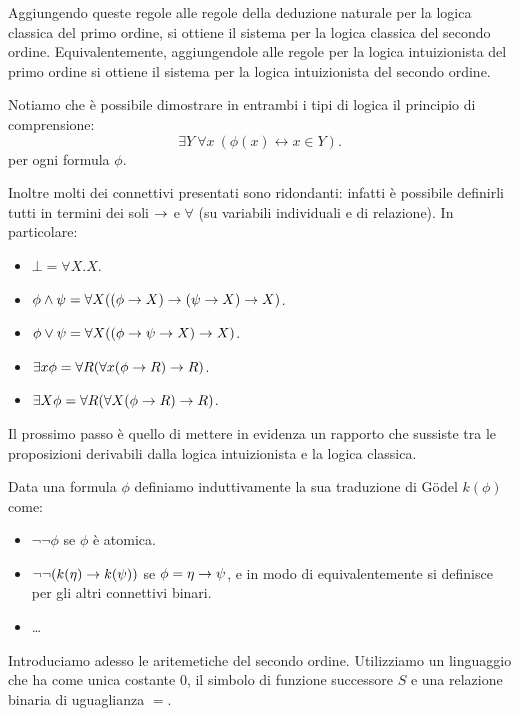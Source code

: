 \documentclass[]{marticle}
\begin{document}
Aggiungendo queste regole alle regole della deduzione naturale per la logica
classica del primo ordine, si ottiene il sistema per la logica classica del
secondo ordine. Equivalentemente, aggiungendole alle regole per la logica
intuizionista del primo ordine si ottiene il sistema per la logica intuizionista
del secondo ordine.

Notiamo che \`e possibile dimostrare in entrambi i tipi di logica il principio
di comprensione:
\[
    \exists Y\ \forall x\ (\phi(x) \leftrightarrow x\in Y).
\]
per ogni formula $\phi$.

Inoltre molti dei connettivi presentati sono ridondanti: infatti \`e possibile
definirli tutti in termini dei soli $\rightarrow$ e $\forall$ (su variabili individuali
e di relazione). In particolare: 
\begin{itemize}
    \item $\bot = \forall X.X$.
    \item $\phi \land \psi = \forall X ((\phi\rightarrow X)\rightarrow (\psi\rightarrow X) \rightarrow X)$.
    \item $\phi \lor \psi = \forall X ((\phi\rightarrow\psi\rightarrow X) \rightarrow X)$.
    \item $\exists x \phi = \forall R (\forall x(\phi\rightarrow R)\rightarrow R)$.
    \item $\exists X \phi = \forall R (\forall X(\phi\rightarrow R)\rightarrow R)$.
\end{itemize}

Il prossimo passo \`e quello di mettere in evidenza un rapporto che sussiste tra
le proposizioni derivabili dalla logica intuizionista e la logica classica.
\begin{block}[Definizione]
    Data una formula $\phi$ definiamo induttivamente la sua traduzione di
    G\"odel $k(\phi)$ come:
    \begin{itemize}
        \item $\lnot\lnot \phi$ se $\phi$ \`e atomica.
        \item $\lnot\lnot(k(\eta)\rightarrow k(\psi))$ se $\phi=\eta\rightarrow\psi$, e in
            modo di equivalentemente si definisce per gli altri connettivi
            binari.
        \item \dots
    \end{itemize}
\end{block}

Introduciamo adesso le aritemetiche del secondo ordine. Utilizziamo un
linguaggio che ha come unica costante $0$, il simbolo di funzione successore
$S$ e una relazione binaria di uguaglianza $=$.
\end{document}
